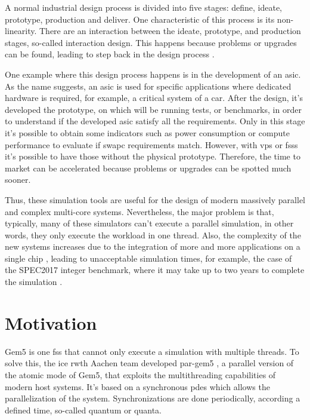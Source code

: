 
A normal industrial design process is divided into five stages: define, ideate, prototype, production and deliver. One characteristic of this process is its non-linearity. There are an interaction between the ideate, prototype, and production stages, so-called interaction design. This happens because problems or upgrades can be found, leading to step back in the design process \cite{ProductDesignSteps}.

One example where this design process happens is in the development of an \gls{asic}. As the name suggests, an \gls{asic} is used for specific applications where dedicated hardware is required, for example, a critical system of a car. After the design, it's developed the prototype, on which will be running tests, or benchmarks, in order to understand if the developed \gls{asic} satisfy all the requirements. Only in this stage it's possible to obtain some indicators such as power consumption or compute performance to evaluate if \gls{swapc} requirements match. However, with \glspl{vp} or \glspl{fss} it's possible to have those without the physical prototype. Therefore, the time to market can be accelerated because problems or upgrades can be spotted much sooner.

Thus, these simulation tools are useful for the design of modern massively parallel and complex multi-core systems. Nevertheless, the major problem is that, typically, many of these simulators can't execute a parallel simulation, in other words, they only execute the workload in one thread. Also, the complexity of the new systems increases due to the integration of more and more applications on a single chip \cite{terascaleComputing}, leading to unacceptable simulation times, for example, the case of the SPEC2017 integer benchmark, where it may take up to two years to complete the simulation \cite{pargem5}.

\section{Motivation}

Gem5 is one \gls{fss} that cannot only execute a simulation with multiple threads. To solve this, the \gls{ice} \gls{rwth} Aachen team developed par-gem5 \cite{pargem5}, a parallel version of the atomic mode of Gem5, that exploits the multithreading capabilities of modern host systems. It’s based on a synchronous \gls{pdes} which allows the parallelization of the system. Synchronizations are done periodically, according a defined time, so-called quantum or quanta.

